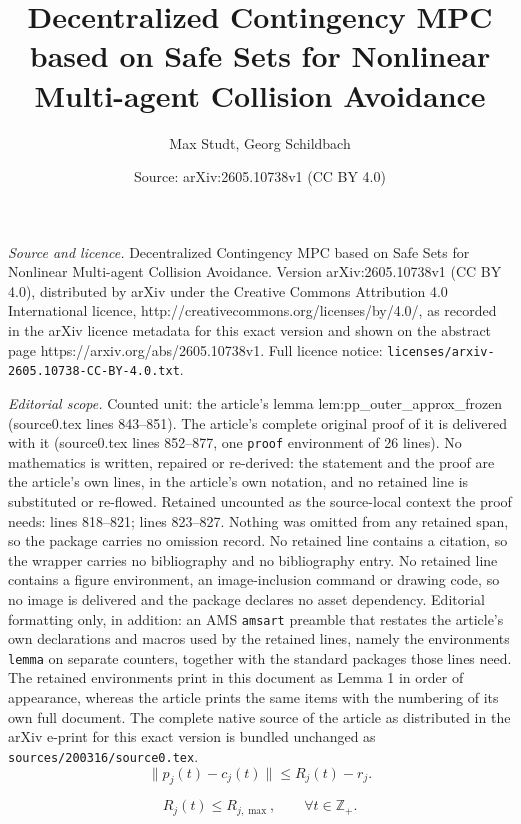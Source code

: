 \documentclass[10pt,a4paper]{amsart}
\title{Decentralized Contingency MPC based on Safe Sets for Nonlinear Multi-agent Collision Avoidance}
\author{Max Studt, Georg Schildbach}
\date{Source: arXiv:2605.10738v1 (CC BY 4.0)}
\begin{document}
\maketitle

\noindent\emph{Source and licence.} Decentralized Contingency MPC based on Safe Sets for Nonlinear Multi-agent Collision Avoidance. Version arXiv:2605.10738v1 (CC BY 4.0), distributed by arXiv under the Creative Commons Attribution 4.0 International licence, http://creativecommons.org/licenses/by/4.0/, as recorded in the arXiv licence metadata for this exact version and shown on the abstract page https://arxiv.org/abs/2605.10738v1. Full licence notice: \texttt{licenses/arxiv-2605.10738-CC-BY-4.0.txt}.\par\smallskip

\noindent\textit{Editorial scope.} Counted unit: the article's lemma lem:pp\_outer\_approx\_frozen (source0.tex lines 843--851). The article's complete original proof of it is delivered with it (source0.tex lines 852--877, one \texttt{proof} environment of 26 lines). No mathematics is written, repaired or re-derived: the statement and the proof are the article's own lines, in the article's own notation, and no retained line is substituted or re-flowed.  Retained uncounted as the source-local context the proof needs: lines 818--821; lines 823--827.  Nothing was omitted from any retained span, so the package carries no omission record.  No retained line contains a citation, so the wrapper carries no bibliography and no bibliography entry.  No retained line contains a figure environment, an image-inclusion command or drawing code, so no image is delivered and the package declares no asset dependency.  Editorial formatting only, in addition: an AMS \texttt{amsart} preamble that restates the article's own declarations and macros used by the retained lines, namely the environments \texttt{lemma} on separate counters, together with the standard packages those lines need.  The retained environments print in this document as Lemma 1 in order of appearance, whereas the article prints the same items with the numbering of its own full document.  The complete native source of the article as distributed in the arXiv e-print for this exact version is bundled unchanged as \texttt{sources/200316/source0.tex}.
\begin{equation}
\|p_j(t)-c_j(t)\|\le R_j(t)-r_j.
\label{eq:pp_center_distance_bound}
\end{equation}

\begin{equation}
R_j(t)\le R_{j,\max},
\qquad \forall t\in\mathbb Z_+.
\label{eq:pp_radius_upper_bound}
\end{equation}
\end{document}
